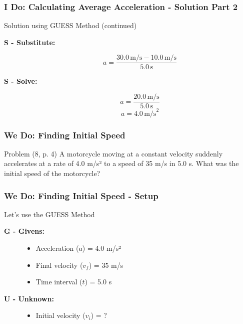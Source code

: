 \documentclass{beamer}
\begin{document}
\begin{frame}
\frametitle{I Do: Calculating Average Acceleration - Solution Part 2}
\begin{block}{Solution using GUESS Method (continued)}
\begin{description}
    \item[\textbf{S - Substitute:}]
        \[ a = \frac{30.0 \, \text{m/s} - 10.0 \, \text{m/s}}{5.0 \, \text{s}} \]
    \item[\textbf{S - Solve:}]
        \[ a = \frac{20.0 \, \text{m/s}}{5.0 \, \text{s}} \]
        \[ a = 4.0 \, \text{m/s}^2 \]
\end{description}
\end{block}
\end{frame}

\begin{frame}
\frametitle{We Do: Finding Initial Speed}
\begin{block}{Problem (8, p. 4)}
A motorcycle moving at a constant velocity suddenly accelerates at a rate of 4.0 m/s² to a speed of 35 m/s in 5.0 s. What was the initial speed of the motorcycle?
\end{block}
\end{frame}

\begin{frame}
\frametitle{We Do: Finding Initial Speed - Setup}
\begin{block}{Let's use the GUESS Method}
\begin{description}
    \item[\textbf{G - Givens:}]
        \begin{itemize}
            \item Acceleration ($a$) = 4.0 m/s²
            \item Final velocity ($v_f$) = 35 m/s
            \item Time interval ($t$) = 5.0 s
        \end{itemize}
    \item[\textbf{U - Unknown:}]
        \begin{itemize}
            \item Initial velocity ($v_i$) = ?
        \end{itemize}
\end{description}
\end{block}
\end{frame}
\end{document}
